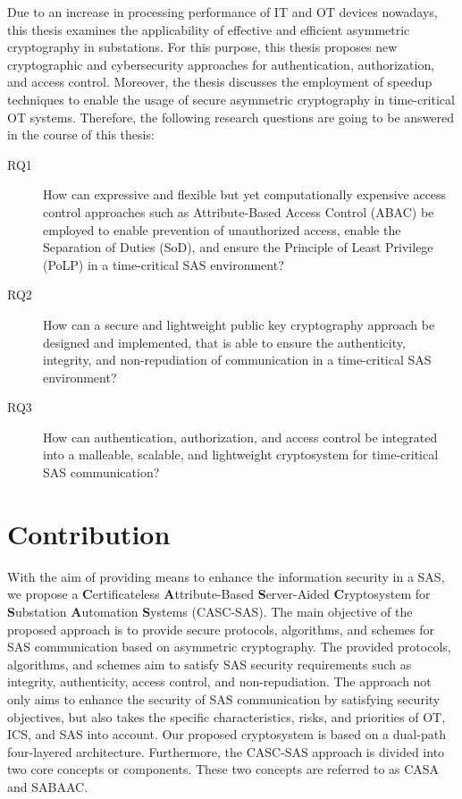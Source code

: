 Due to an increase in processing performance of IT and OT devices nowadays, this thesis examines the applicability of effective and efficient asymmetric cryptography in substations.
For this purpose, this thesis proposes new cryptographic and cybersecurity approaches for authentication, authorization, and access control.
Moreover, the thesis discusses the employment of speedup techniques to enable the usage of secure asymmetric cryptography in time-critical OT systems.
Therefore, the following research questions are going to be answered in the course of this thesis:
\begin{description}
    \item[RQ1] How can expressive and flexible but yet computationally expensive access control approaches such as Attribute-Based Access Control (ABAC) be employed to enable prevention of unauthorized access, enable the Separation of Duties (SoD), and ensure the Principle of Least Privilege (PoLP) in a time-critical SAS environment?
    \item[RQ2] How can a secure and lightweight public key cryptography approach be designed and implemented, that is able to ensure the authenticity, integrity, and non-repudiation of communication in a time-critical SAS environment?
    \item[RQ3] How can authentication, authorization, and access control be integrated into a malleable, scalable, and lightweight cryptosystem for time-critical SAS communication?
\end{description}

\section{Contribution}
\label{sec:introduction:contribution}
With the aim of providing means to enhance the information security in a SAS, we propose a \textbf{C}ertificateless \textbf{A}ttribute-Based \textbf{S}erver-Aided \textbf{C}ryptosystem for \textbf{S}ubstation \textbf{A}utomation \textbf{S}ystems (CASC-SAS).
The main objective of the proposed approach is to provide secure protocols, algorithms, and schemes for SAS communication based on asymmetric cryptography.
The provided protocols, algorithms, and schemes aim to satisfy SAS security requirements such as integrity, authenticity, access control, and non-repudiation.
The approach not only aims to enhance the security of SAS communication by satisfying security objectives, but also takes the specific characteristics, risks, and priorities of OT, ICS, and SAS into account.
Our proposed cryptosystem is based on a dual-path four-layered architecture.
Furthermore, the CASC-SAS approach is divided into two core concepts or components.
These two concepts are referred to as CASA and SABAAC.

